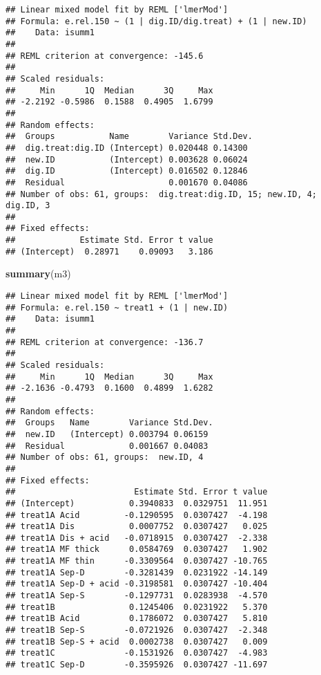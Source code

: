\documentclass[
]{article}
\newenvironment{Shaded}{\begin{snugshade}}{\end{snugshade}}
\newcommand{\FunctionTok}[1]{\textcolor[rgb]{0.13,0.29,0.53}{\textbf{#1}}}
\newcommand{\NormalTok}[1]{#1}
\begin{document}
\begin{verbatim}
## Linear mixed model fit by REML ['lmerMod']
## Formula: e.rel.150 ~ (1 | dig.ID/dig.treat) + (1 | new.ID)
##    Data: isumm1
## 
## REML criterion at convergence: -145.6
## 
## Scaled residuals: 
##     Min      1Q  Median      3Q     Max 
## -2.2192 -0.5986  0.1588  0.4905  1.6799 
## 
## Random effects:
##  Groups           Name        Variance Std.Dev.
##  dig.treat:dig.ID (Intercept) 0.020448 0.14300 
##  new.ID           (Intercept) 0.003628 0.06024 
##  dig.ID           (Intercept) 0.016502 0.12846 
##  Residual                     0.001670 0.04086 
## Number of obs: 61, groups:  dig.treat:dig.ID, 15; new.ID, 4; dig.ID, 3
## 
## Fixed effects:
##             Estimate Std. Error t value
## (Intercept)  0.28971    0.09093   3.186
\end{verbatim}

\begin{Shaded}
\begin{Highlighting}[]
\FunctionTok{summary}\NormalTok{(m3)}
\end{Highlighting}
\end{Shaded}

\begin{verbatim}
## Linear mixed model fit by REML ['lmerMod']
## Formula: e.rel.150 ~ treat1 + (1 | new.ID)
##    Data: isumm1
## 
## REML criterion at convergence: -136.7
## 
## Scaled residuals: 
##     Min      1Q  Median      3Q     Max 
## -2.1636 -0.4793  0.1600  0.4899  1.6282 
## 
## Random effects:
##  Groups   Name        Variance Std.Dev.
##  new.ID   (Intercept) 0.003794 0.06159 
##  Residual             0.001667 0.04083 
## Number of obs: 61, groups:  new.ID, 4
## 
## Fixed effects:
##                        Estimate Std. Error t value
## (Intercept)           0.3940833  0.0329751  11.951
## treat1A Acid         -0.1290595  0.0307427  -4.198
## treat1A Dis           0.0007752  0.0307427   0.025
## treat1A Dis + acid   -0.0718915  0.0307427  -2.338
## treat1A MF thick      0.0584769  0.0307427   1.902
## treat1A MF thin      -0.3309564  0.0307427 -10.765
## treat1A Sep-D        -0.3281439  0.0231922 -14.149
## treat1A Sep-D + acid -0.3198581  0.0307427 -10.404
## treat1A Sep-S        -0.1297731  0.0283938  -4.570
## treat1B               0.1245406  0.0231922   5.370
## treat1B Acid          0.1786072  0.0307427   5.810
## treat1B Sep-S        -0.0721926  0.0307427  -2.348
## treat1B Sep-S + acid  0.0002738  0.0307427   0.009
## treat1C              -0.1531926  0.0307427  -4.983
## treat1C Sep-D        -0.3595926  0.0307427 -11.697
\end{verbatim}
\end{document}
